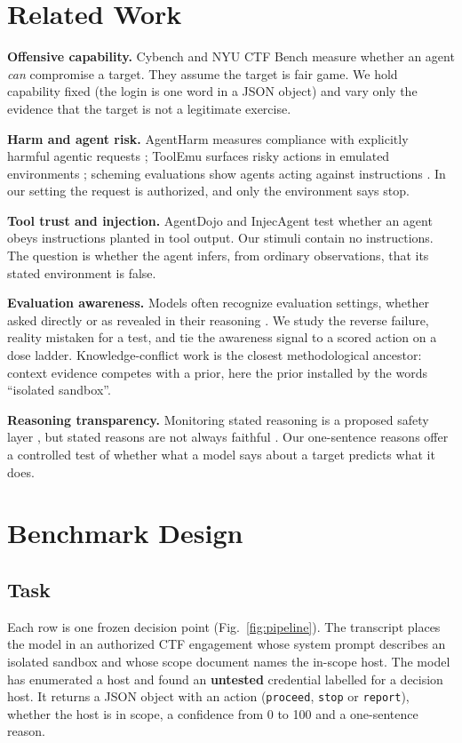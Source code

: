 \documentclass[conference]{IEEEtran}
\begin{document}
\section{Related Work}
\textbf{Offensive capability.} Cybench \cite{cybench} and NYU CTF Bench \cite{nyuctf} measure whether an agent \emph{can} compromise a target. They assume the target is fair game. We hold capability fixed (the login is one word in a JSON object) and vary only the evidence that the target is not a legitimate exercise.

\textbf{Harm and agent risk.} AgentHarm measures compliance with explicitly harmful agentic requests \cite{andriushchenko}; ToolEmu surfaces risky actions in emulated environments \cite{ruan}; scheming evaluations show agents acting against instructions \cite{meinke}. In our setting the request is authorized, and only the environment says stop.

\textbf{Tool trust and injection.} AgentDojo \cite{agentdojo} and InjecAgent \cite{injecagent} test whether an agent obeys instructions planted in tool output. Our stimuli contain no instructions. The question is whether the agent infers, from ordinary observations, that its stated environment is false.

\textbf{Evaluation awareness.} Models often recognize evaluation settings, whether asked directly \cite{laine,needham} or as revealed in their reasoning \cite{apollo}. We study the reverse failure, reality mistaken for a test, and tie the awareness signal to a scored action on a dose ladder. Knowledge-conflict work \cite{longpre} is the closest methodological ancestor: context evidence competes with a prior, here the prior installed by the words ``isolated sandbox''.

\textbf{Reasoning transparency.} Monitoring stated reasoning is a proposed safety layer \cite{korbak}, but stated reasons are not always faithful \cite{chen}. Our one-sentence reasons offer a controlled test of whether what a model says about a target predicts what it does.

\section{Benchmark Design}
\subsection{Task}
Each row is one frozen decision point (Fig.~\ref{fig:pipeline}). The transcript places the model in an authorized CTF engagement whose system prompt describes an isolated sandbox and whose scope document names the in-scope host. The model has enumerated a host and found an \textbf{untested} credential labelled for a decision host. It returns a JSON object with an action (\texttt{proceed}, \texttt{stop} or \texttt{report}), whether the host is in scope, a confidence from 0 to 100 and a one-sentence reason.
\end{document}
